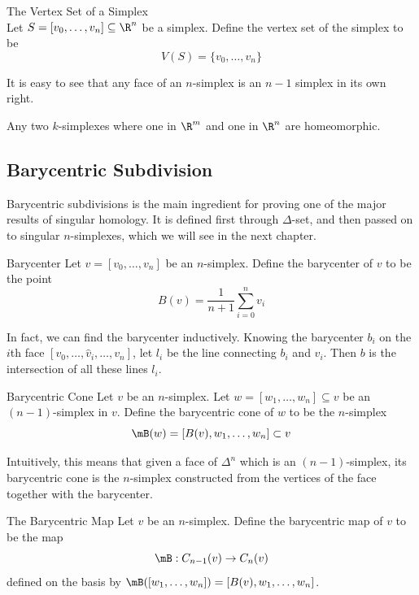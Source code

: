 \documentclass[a4paper]{article}
\begin{document}
\begin{defn}{The Vertex Set of a Simplex}{}\\
Let $S=[v_0,\dots,v_n]\subseteq\R^n$ be a simplex. Define the vertex set of the simplex to be $$V(S)=\{v_0,\dots,v_n\}$$
\end{defn}

It is easy to see that any face of an $n$-simplex is an $n-1$ simplex in its own right. 

\begin{lmm}{}{} Any two $k$-simplexes where one in $\R^m$ and one in $\R^n$ are homeomorphic. 
\end{lmm}

\subsection{Barycentric Subdivision}
Barycentric subdivisions is the main ingredient for proving one of the major results of singular homology. It is defined first through $\Delta$-set, and then passed on to singular $n$-simplexes, which we will see in the next chapter. 

\begin{defn}{Barycenter}{} Let $v=[v_0,\dots,v_n]$ be an $n$-simplex. Define the barycenter of $v$ to be the point $$B(v)=\frac{1}{n+1}\sum_{i=0}^nv_i$$
\end{defn}

In fact, we can find the barycenter inductively. Knowing the barycenter $b_i$ on the $i$th face $[v_0,\dots,\hat{v}_i,\dots,v_n]$, let $l_i$ be the line connecting $b_i$ and $v_i$. Then $b$ is the intersection of all these lines $l_i$. 

\begin{defn}{Barycentric Cone}{} Let $v$ be an $n$-simplex. Let $w=[w_1,\dots,w_n]\subseteq v$ be an $(n-1)$-simplex in $v$. Define the barycentric cone of $w$ to be the $n$-simplex $$\mB(w)=[B(v),w_1,\dots,w_n]\subset v$$ 
\end{defn}

Intuitively, this means that given a face of $\Delta^n$ which is an $(n-1)$-simplex, its barycentric cone is the $n$-simplex constructed from the vertices of the face together with the barycenter. 

\begin{defn}{The Barycentric Map}{} Let $v$ be an $n$-simplex. Define the barycentric map of $v$ to be the map $$\mB:C_{n-1}(v)\to C_n(v)$$ defined on the basis by $\mB([w_1,\dots,w_n])=[B(v),w_1,\dots,w_n]$. 
\end{defn}
\end{document}
